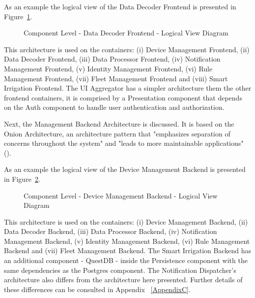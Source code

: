 As an example the logical view of the Data Decoder Frontend is presented in Figure~\ref{fig:design:architecture:component:logical:diagram:decoder}.

\begin{figure}[H]
   \centering
   \resizebox{\columnwidth}{!}
   {
      
   }
   \caption[Component Level - Data Decoder Frontend - Logical View Diagram]{Component Level - Data Decoder Frontend - Logical View Diagram}
   \label{fig:design:architecture:component:logical:diagram:decoder}
\end{figure}

This architecture is used on the containers: (i) Device Management Frontend, (ii) Data Decoder Frontend, (iii) Data Processor Frontend, (iv) Notification Management Frontend, (v) Identity Management Frontend, (vi) Rule Management Frontend, (vii) Fleet Management Frontend and (viii) Smart Irrigation Frontend. The UI Aggregator has a simpler architecture them the other frontend containers, it is comprised by a Presentation component that depends on the Auth component to handle user authentication and authorization.

Next, the Management Backend Architecture is discussed. It is based on the Onion Architecture, an architecture pattern that "emphasizes separation of concerns throughout the system" and "leads to more maintainable applications" (\cite{onion}).

As an example the logical view of the Device Management Backend is presented in Figure~\ref{fig:design:architecture:component:logical:diagram:device}.

\begin{figure}[H]
   \centering
   \resizebox{\columnwidth}{!}
   {
      
   }
   \caption[Component Level - Device Management Backend - Logical View Diagram]{Component Level - Device Management Backend - Logical View Diagram}
   \label{fig:design:architecture:component:logical:diagram:device}
\end{figure}

This architecture is used on the containers: (i) Device Management Backend, (ii) Data Decoder Backend, (iii) Data Processor Backend, (iv) Notification Management Backend, (v) Identity Management Backend, (vi) Rule Management Backend and (vii) Fleet Management Backend. The Smart Irrigation Backend has an additional component - QuestDB - inside the Persistence component with the same dependencies as the Postgres component. The Notification Dispatcher's architecture also differs from the architecture here presented. Further details of these differences can be consulted in Appendix ~\ref{AppendixC}.

